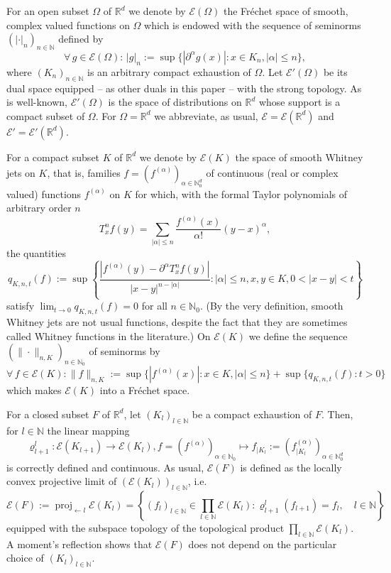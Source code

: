 \documentclass[10pt,leqno]{amsart}
\theoremstyle{definition}
\newcommand{\R}{\mathbb R}
\newcommand{\N}{\mathbb N}
\let\rho\varrho
\begin{document}
For an open subset $\Omega$ of $\R^d$ we denote by $\mathscr{E}(\Omega)$ the Fr\'echet space of smooth, complex valued functions on $\Omega$ which is endowed with the sequence of seminorms $(|\cdot|_n)_{n\in\N}$ defined by
\begin{equation}\label{eq:seminorms on E}
	\forall\,g\in\mathscr{E}(\Omega)\colon\,|g|_n:=\sup\{|\partial^{\alpha}g(x)|:x\in K_n, |\alpha|\leq n\},
\end{equation}
where $(K_n)_{n\in\N}$ is an arbitrary compact exhaustion of $\Omega$. Let $\mathscr{E}'(\Omega)$ be its dual space equipped -- as other duals in this paper -- with the strong topology. As is well-known, $\mathscr{E}'(\Omega)$ is the space of distributions on $\R^d$ whose support is a compact subset of $\Omega$. For $\Omega=\R^d$ we abbreviate, as usual, $\mathscr{E}=\mathscr{E}(\R^d)$ and $\mathscr{E}'=\mathscr{E}'(\R^d)$.

For a compact subset $K$ of $\R^d$ we denote by $\mathscr{E}(K)$ the space of smooth Whitney jets on $K$, that is, families $f=(f^{(\alpha)})_{\alpha\in\N_0^d}$ of continuous (real or complex valued) functions $f^{(\alpha)}$ on $K$ for which, with the formal Taylor polynomials of arbitrary order $n$
$$T^n_xf(y)=\sum_{|\alpha|\leq n}\frac{f^{(\alpha)}(x)}{\alpha!}(y-x)^\alpha,$$
the quantities
$$q_{K,n,t}(f):=\sup\left\{\frac{|f^{(\alpha)}(y)-\partial^\alpha T_x^nf(y)|}{|x-y|^{n-|\alpha|}}\colon |\alpha|\leq n, x,y\in K, 0<|x-y|<t\right\}$$
satisfy $\lim_{t\rightarrow 0}q_{K,n,t}(f)=0$ for all $n\in\N_0$. (By the very definition, smooth Whitney jets are not usual functions, despite the fact that they are sometimes called Whitney functions in the literature.) On $\mathscr{E}(K)$ we define the sequence $(\|\cdot\|_{n,K})_{n\in\N_0}$ of seminorms by
$$\forall\,f\in\mathscr{E}(K)\colon \|f\|_{n,K}:=\sup\{|f^{(\alpha)}(x)|\colon x\in K, |\alpha|\leq n\}+\sup\{q_{K,n,t}(f)\colon t>0\}$$
which makes $\mathscr{E}(K)$ into a Fr\'echet space.

For a closed subset $F$ of $\R^d$, let $(K_l)_{l\in\N}$ be a compact exhaustion of $F$. Then, for $l\in\N$ the linear mapping
$$\rho_{l+1}^l:\mathscr{E}(K_{l+1})\rightarrow\mathscr{E}(K_l), f=(f^{(\alpha)})_{\alpha\in\N_0}\mapsto f_{\mid K_l}:=(f^{(\alpha)}_{\mid K_l})_{\alpha\in\N_0^d}$$
is correctly defined and continuous.
As usual, $\mathscr{E}(F)$ is defined as the locally convex projective limit of $(\mathscr{E}(K_l))_{l\in\N}$, i.e.\ 
$$\mathscr{E}(F):=\operatorname{proj}_{\leftarrow l}\mathscr{E}(K_l)=\left\{(f_l)_{l\in\N}\in\prod_{l\in\N}\mathscr{E}(K_l)\colon \rho_{l+1}^l(f_{l+1})=f_l,\quad l\in\N\right\}$$
equipped with the subspace topology of the topological product $\prod_{l\in\N}\mathscr{E}(K_l)$. A moment's reflection shows that $\mathscr{E}(F)$ does not depend on the particular choice of $(K_l)_{l\in\N}$.
\end{document}
